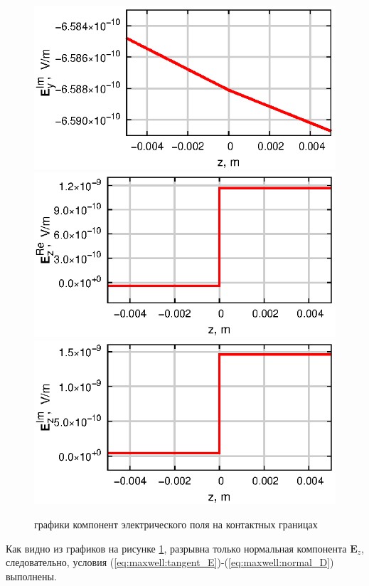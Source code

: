 \documentclass[a4paper,12pt]{article}
\begin{document}
\begin{figure}[H]
	\includegraphics[scale=1]{research-2/650/EyI.eps}
	\includegraphics[scale=1]{research-2/650/EzR.eps}
	\includegraphics[scale=1]{research-2/650/EzI.eps}
	\caption{графики компонент электрического поля на контактных границах}
	\label{fig:res2:650_3}
\end{figure}

Как видно из графиков на рисунке \ref{fig:res2:650_3}, разрывна только нормальная компонента $\mathbf{E}_z$, следовательно, условия (\ref{eq:maxwell:tangent_E})-(\ref{eq:maxwell:normal_D}) выполнены.
\end{document}
